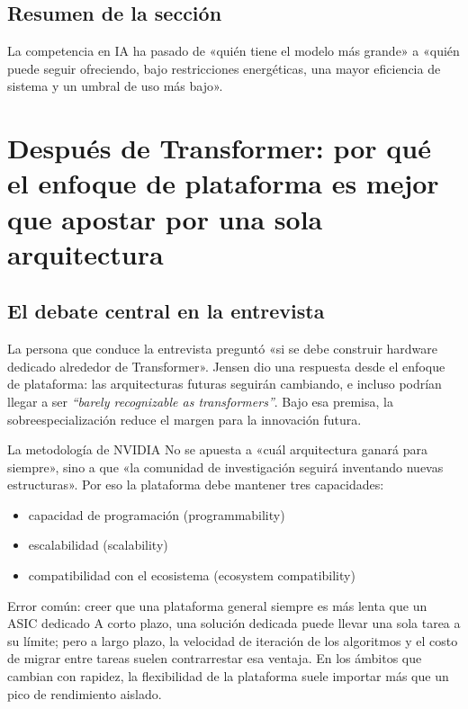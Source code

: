 \documentclass[a4paper]{article}
\begin{document}
\subsection{Resumen de la sección}
La competencia en IA ha pasado de «quién tiene el modelo más grande» a «quién puede seguir ofreciendo, bajo restricciones energéticas, una mayor eficiencia de sistema y un umbral de uso más bajo».

\section{Después de Transformer: por qué el enfoque de plataforma es mejor que apostar por una sola arquitectura}

\subsection{El debate central en la entrevista}

La persona que conduce la entrevista preguntó «si se debe construir hardware dedicado alrededor de Transformer». Jensen dio una respuesta desde el enfoque de plataforma: las arquitecturas futuras seguirán cambiando, e incluso podrían llegar a ser \textit{``barely recognizable as transformers''}. Bajo esa premisa, la sobreespecialización reduce el margen para la innovación futura.

\begin{importantbox}{La metodología de NVIDIA}
No se apuesta a «cuál arquitectura ganará para siempre», sino a que «la comunidad de investigación seguirá inventando nuevas estructuras». Por eso la plataforma debe mantener tres capacidades:
\begin{itemize}
    \item capacidad de programación (programmability)
    \item escalabilidad (scalability)
    \item compatibilidad con el ecosistema (ecosystem compatibility)
\end{itemize}
\end{importantbox}

\begin{warningbox}{Error común: creer que una plataforma general siempre es más lenta que un ASIC dedicado}
A corto plazo, una solución dedicada puede llevar una sola tarea a su límite; pero a largo plazo, la velocidad de iteración de los algoritmos y el costo de migrar entre tareas suelen contrarrestar esa ventaja. En los ámbitos que cambian con rapidez, la flexibilidad de la plataforma suele importar más que un pico de rendimiento aislado.
\end{warningbox}
\end{document}
